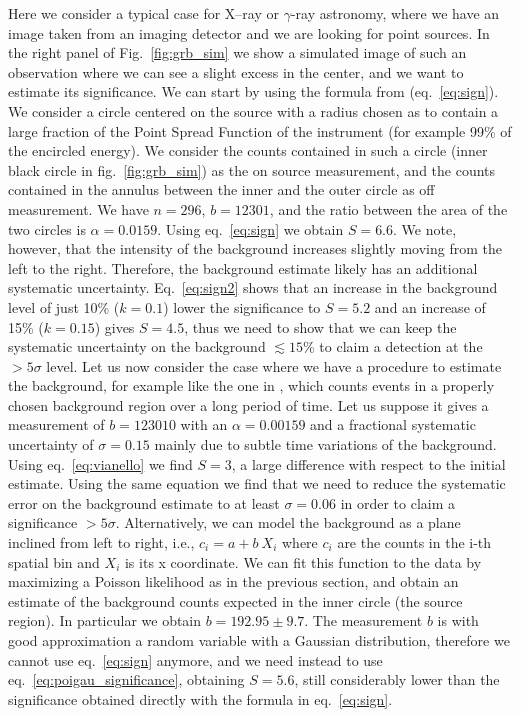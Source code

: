 \documentclass[twocolumn]{aastex61}
\renewcommand{\textbf}{}
\begin{document}
Here we consider a typical case for X--ray or $\gamma$-ray astronomy, where we have an image taken from an imaging detector and we are looking for point sources. In the right panel of Fig.~\ref{fig:grb_sim} we show a simulated image of such an observation where we can see a slight excess in the center, and we want to estimate its significance. We can start by using the formula from \citet{LiMa} (eq.~\ref{eq:sign}). \textbf{We consider a circle centered on the source with a radius chosen as to contain a large fraction of the Point Spread Function of the instrument (for example 99\% of the encircled energy)}. We consider the counts contained in such a circle (inner black circle in fig.~\ref{fig:grb_sim}) as the on source measurement, and the counts contained in the annulus between the inner and the outer circle as off measurement.  We have $n=296$, $b=12301$, and the ratio between the area of the two circles is $\alpha=0.0159$. Using eq.~\ref{eq:sign} we obtain $S=6.6$. We note, however, that the intensity of the background increases slightly moving from the left to the right. Therefore, the background estimate likely has an additional systematic uncertainty. Eq.~\ref{eq:sign2} shows that an increase in the background level of just 10\% ($k=0.1$) lower the significance to $S=5.2$ and an increase of 15\% ($k=0.15$) gives $S=4.5$, thus we need to show that we can keep the systematic uncertainty on the background $\lesssim 15$\% to claim a detection at the $>5\sigma$ level. \textbf{Let us now consider the case where we have a procedure to estimate the background, for example like the one in \citet{Vasileiou2013}, which counts events in a properly chosen background region over a long period of time. Let us suppose it gives a measurement of $b=123010$ with an $\alpha = 0.00159$ and a fractional systematic uncertainty of $\sigma = 0.15$ mainly due to subtle time variations of the background. Using eq.~\ref{eq:vianello} we find $S=3$, a large difference with respect to the initial estimate.} Using the same equation we find that we need to reduce the systematic error on the background estimate to at least $\sigma = 0.06$ in order to claim a significance $>5\sigma$. Alternatively, we can model the background as a plane inclined from left to right, i.e., $c_i = a + b~X_i$ where $c_i$ are the counts in the i-th spatial bin and $X_i$ is its x coordinate. We can fit this function to the data by maximizing a Poisson likelihood as in the previous section, and obtain an estimate of the background counts expected in the inner circle (the source region). In particular we obtain $b = 192.95 \pm 9.7$. The measurement $b$ is with good approximation a random variable with a Gaussian distribution, therefore we cannot use eq.~\ref{eq:sign} anymore, and we need instead to use eq.~\ref{eq:poigau_significance}, obtaining $S=5.6$, still considerably lower than the significance obtained directly with the \citet{LiMa} formula in eq.~\ref{eq:sign}.
\end{document}
